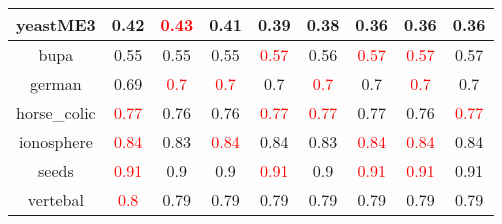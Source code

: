 \documentclass{article}%
\begin{document}
\begin{tabular}{c|cccccccc}
\hline%
yeastME3&0.42&\textcolor{red}{ 
0.43
}&\textbf{0.41}&0.39&\textbf{0.38}&0.36&0.36&0.36\\%
\hline%
bupa&0.55&0.55&0.55&\textcolor{red}{ 
0.57
}&0.56&\textcolor{red}{ 
0.57
}&\textcolor{red}{ 
0.57
}&0.57\\%
\hline%
german&0.69&\textcolor{red}{ 
0.7
}&\textcolor{red}{ 
0.7
}&0.7&\textcolor{red}{ 
0.7
}&0.7&\textcolor{red}{ 
0.7
}&0.7\\%
\hline%
horse\_colic&\textcolor{red}{ 
0.77
}&0.76&0.76&\textcolor{red}{ 
0.77
}&\textcolor{red}{ 
0.77
}&0.77&0.76&\textcolor{red}{ 
0.77
}\\%
\hline%
ionosphere&\textcolor{red}{ 
0.84
}&0.83&\textcolor{red}{ 
0.84
}&0.84&0.83&\textcolor{red}{ 
0.84
}&\textcolor{red}{ 
0.84
}&0.84\\%
\hline%
seeds&\textcolor{red}{ 
0.91
}&0.9&0.9&\textcolor{red}{ 
0.91
}&0.9&\textcolor{red}{ 
0.91
}&\textcolor{red}{ 
0.91
}&0.91\\%
\hline%
vertebal&\textcolor{red}{ 
0.8
}&0.79&0.79&0.79&0.79&0.79&0.79&0.79\\%
\hline%
\end{tabular}

%
\end{document}
